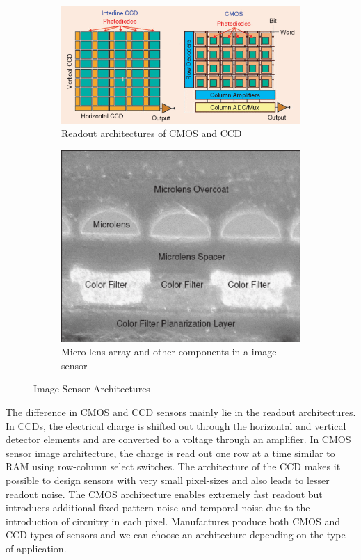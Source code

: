 \begin{figure}[ht]
\centering
\begin{subfigure}{0.75\textwidth}
  \centering
  \includegraphics[width=.75\linewidth]{pics/cmos/cmosccd}
  \caption{Readout architectures of CMOS and CCD}
  \label{fig:cmos_ccd}
\end{subfigure}
\begin{subfigure}{0.75\textwidth}
  \centering
  \includegraphics[width=.75\linewidth]{pics/cmos/cmosmicro}
  \caption{Micro lens array and other components in a image sensor}
  \label{fig:cmos_micro}
\end{subfigure}
\caption{Image Sensor Architectures\cite{cmos}}
\label{fig:cmos_1}
\end{figure}

The difference in CMOS and CCD sensors mainly lie in the readout architectures. In CCDs, the electrical charge is shifted out through the horizontal and vertical detector elements and are converted to a voltage through an amplifier. In CMOS sensor image architecture, the charge is read out one row at a time similar to RAM using row-column select switches\cite{cmos}. The architecture of the CCD makes it possible to design sensors with very small pixel-sizes and also leads to lesser readout noise. The CMOS architecture enables extremely fast readout but introduces additional fixed pattern noise and temporal noise due to the introduction of circuitry in each pixel. Manufactures produce both CMOS and CCD types of sensors and we can choose an architecture depending on the type of application. 

